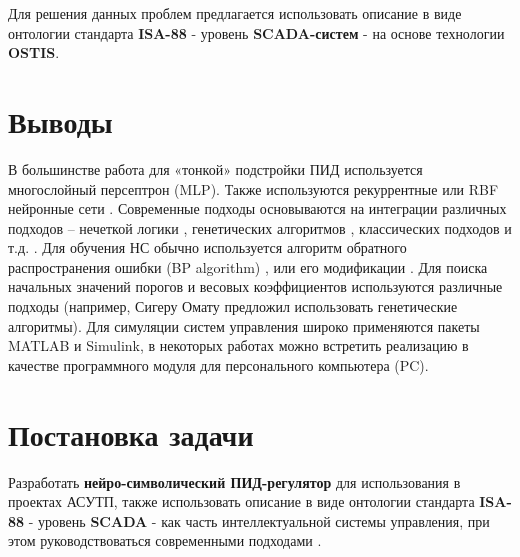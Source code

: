 Для решения данных проблем предлагается использовать описание в виде онтологии стандарта \textbf{ISA-88} - уровень \textbf{SCADA-систем} - на основе технологии \textbf{OSTIS}.

\section{Выводы}

В большинстве работа для «тонкой» подстройки ПИД используется многослойный персептрон (MLP). Также используются рекуррентные или RBF нейронные сети \cite{Reza2011}. Современные подходы основываются на интеграции различных подходов – нечеткой логики \cite{Tahour2007}, генетических алгоритмов \cite{Sharkawy2006}, классических подходов и т.д. \cite{Omatu_Khalid_Yusof}.
Для обучения НС обычно используется алгоритм обратного распространения ошибки (BP algorithm) \cite{Omatu_Khalid_Yusof}, \cite{Ruano1992ApplicationsON} или его модификации \cite{Han1999}. Для поиска начальных значений порогов и весовых коэффициентов используются различные подходы (например, Сигеру Омату \cite{Omatu_Khalid_Yusof} предложил использовать генетические алгоритмы). Для симуляции систем управления широко применяются пакеты MATLAB и Simulink, в некоторых работах можно встретить реализацию в качестве программного модуля для персонального компьютера (PC).

\section{Постановка задачи}

Разработать \textbf{нейро-символический ПИД-регулятор} для использования в проектах АСУТП, также использовать описание в виде онтологии стандарта \textbf{ISA-88} - уровень \textbf{SCADA} - как часть интеллектуальной системы управления, при этом руководствоваться современными подходами \cite{Бурков2022}.
